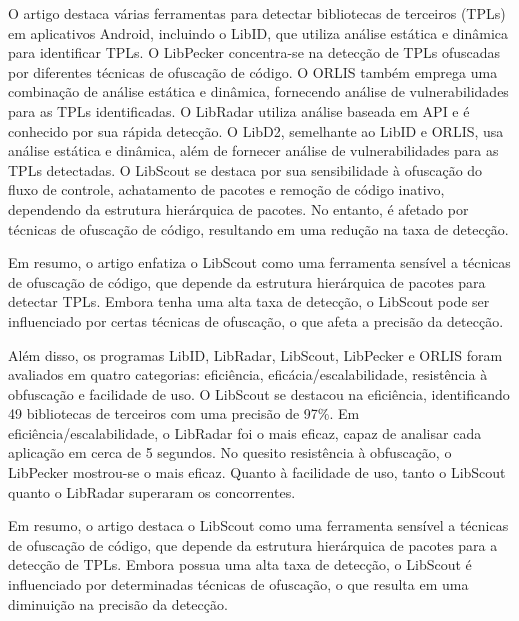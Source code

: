 
O artigo destaca várias ferramentas para detectar bibliotecas de terceiros (TPLs) em aplicativos Android, incluindo o LibID, que utiliza análise estática e dinâmica para identificar TPLs. O LibPecker concentra-se na detecção de TPLs ofuscadas por diferentes técnicas de ofuscação de código. O ORLIS também emprega uma combinação de análise estática e dinâmica, fornecendo análise de vulnerabilidades para as TPLs identificadas. O LibRadar utiliza análise baseada em API e é conhecido por sua rápida detecção. O LibD2, semelhante ao LibID e ORLIS, usa análise estática e dinâmica, além de fornecer análise de vulnerabilidades para as TPLs detectadas. O LibScout se destaca por sua sensibilidade à ofuscação do fluxo de controle, achatamento de pacotes e remoção de código inativo, dependendo da estrutura hierárquica de pacotes. No entanto, é afetado por técnicas de ofuscação de código, resultando em uma redução na taxa de detecção.

Em resumo, o artigo enfatiza o LibScout como uma ferramenta sensível a técnicas de ofuscação de código, que depende da estrutura hierárquica de pacotes para detectar TPLs. Embora tenha uma alta taxa de detecção, o LibScout pode ser influenciado por certas técnicas de ofuscação, o que afeta a precisão da detecção.

Além disso, os programas LibID, LibRadar, LibScout, LibPecker e ORLIS foram avaliados em quatro categorias: eficiência, eficácia/escalabilidade, resistência à obfuscação e facilidade de uso. O LibScout se destacou na eficiência, identificando 49 bibliotecas de terceiros com uma precisão de 97\%. Em eficiência/escalabilidade, o LibRadar foi o mais eficaz, capaz de analisar cada aplicação em cerca de 5 segundos. No quesito resistência à obfuscação, o LibPecker mostrou-se o mais eficaz. Quanto à facilidade de uso, tanto o LibScout quanto o LibRadar superaram os concorrentes.

Em resumo, o artigo destaca o LibScout como uma ferramenta sensível a técnicas de ofuscação de código, que depende da estrutura hierárquica de pacotes para a detecção de TPLs. Embora possua uma alta taxa de detecção, o LibScout é influenciado por determinadas técnicas de ofuscação, o que resulta em uma diminuição na precisão da detecção.

